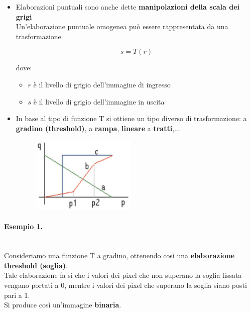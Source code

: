 \begin{itemize}
    \item Elaborazioni puntuali sono anche dette \textbf{manipolazioni della scala dei
              grigi}\\
          Un'elaborazione puntuale omogenea può essere rappresentata da
          una trasformazione

          $$
              s = T(r)
          $$

          dove:
          \begin{itemize}
              \item $r$ è il livello di grigio dell'immagine di ingresso
              \item $s$ è il livello di grigio dell'immagine in uscita
          \end{itemize}
    \item In base al tipo di funzione T si ottiene un tipo diverso di
          trasformazione: a \textbf{gradino (threshold)}, a \textbf{rampa},
          \textbf{lineare} a \textbf{tratti},...

          \begin{figure}[H]
              \centering
              \includegraphics[width=5cm, keepaspectratio]{capitoli/immagini/imgs/elaborazioni_puntuali_immagine.jpg}
          \end{figure}

\end{itemize}

\paragraph{Esempio 1.} \ \\

Consideriamo una funzione T a gradino, ottenendo così una
\textbf{elaborazione threshold (soglia)}.\\
Tale elaborazione fa sì che i valori dei pixel che non superano la
soglia fissata vengano portati a 0, mentre i valori dei pixel che
superano la soglia siano posti pari a 1.\\
Si produce così un'immagine \textbf{binaria}.

